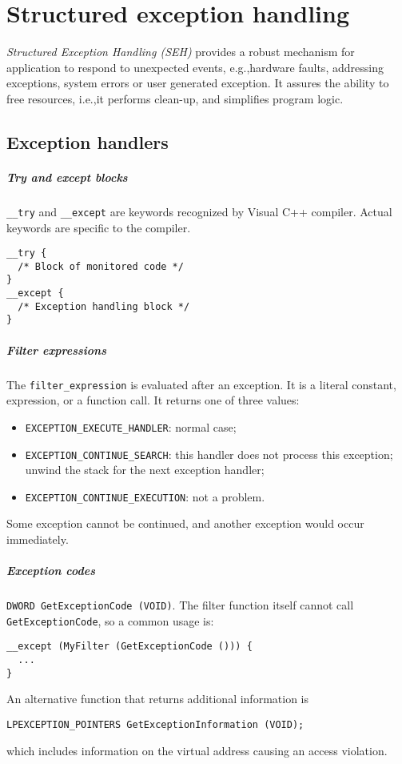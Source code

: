 \chapter{Structured exception handling}
\emph{Structured Exception Handling (SEH)} provides a robust mechanism for application to respond to unexpected events, e.g.,\@ hardware faults, addressing exceptions, system errors or user generated exception. It assures the ability to free resources, i.e.,\@ it performs clean-up, and simplifies program logic.

\section{Exception handlers}
\paragraph{Try and except blocks}
\texttt{\_\_try} and \texttt{\_\_except} are keywords recognized by Visual C++ compiler. Actual keywords are specific to the compiler.

\begin{verbatim}
__try {
  /* Block of monitored code */
}
__except {
  /* Exception handling block */
}
\end{verbatim}

\paragraph{Filter expressions}
The \texttt{filter\_expression} is evaluated after an exception. It is a literal constant, expression, or a function call. It returns one of three values:
\begin{itemize}
\item \texttt{EXCEPTION\_EXECUTE\_HANDLER}: normal case;
\item \texttt{EXCEPTION\_CONTINUE\_SEARCH}: this handler does not process this exception; unwind the stack for the next exception handler;
\item \texttt{EXCEPTION\_CONTINUE\_EXECUTION}: not a problem.
\end{itemize}
Some exception cannot be continued, and another exception would occur immediately.

\paragraph{Exception codes} \texttt{DWORD GetExceptionCode (VOID)}. The filter function itself cannot call \texttt{GetExceptionCode}, so a common usage is:
\begin{verbatim}
__except (MyFilter (GetExceptionCode ())) {
  ...
}
\end{verbatim}
An alternative function that returns additional information is
\begin{verbatim}
LPEXCEPTION_POINTERS GetExceptionInformation (VOID);
\end{verbatim}
which includes information on the virtual address causing an access violation.

